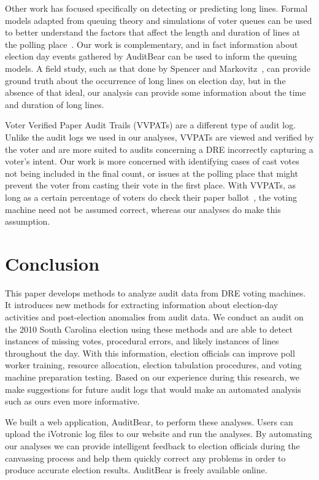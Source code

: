 \documentclass[letterpaper,twocolumn,10pt]{article}
\begin{document}
Other work has focused specifically on detecting or predicting long
lines. Formal models adapted from queuing theory and simulations of voter queues
can be used to better understand the factors that affect the length and duration
of lines at the polling place~\cite{Allen2006, Edel2010}. Our work is
complementary, and in fact information about election day events gathered by
AuditBear can be used to inform the queuing models. A field study, such as that
done by Spencer and Markovitz~\cite{Spencer2010}, can provide ground truth about
the occurrence of long lines on election day, but in the absence of that ideal,
our analysis can provide some information about the time and duration of long
lines. 

Voter Verified Paper Audit Trails (VVPATs) are a different type of audit
log. Unlike the audit logs we used in our analyses, VVPATs are viewed and
verified by the voter and are more suited to audits concerning a DRE incorrectly
capturing a voter’s intent. Our work is more concerned with identifying cases of
cast votes not being included in the final count, or issues at the polling place
that might prevent the voter from casting their vote in the first place. With
VVPATs, as long as a certain percentage of voters do check their paper
ballot~\cite{Hall2006}, the voting machine need not be assumed correct, whereas
our analyses do make this assumption. 

\section{Conclusion}
This paper develops methods to analyze audit data from DRE voting machines. It 
introduces new methods for extracting information about election-day activities
and post-election anomalies from audit data.  
We conduct an audit on the 2010 South Carolina 
election using these methods and are able to detect instances of missing votes,
procedural errors, and likely instances of lines throughout the day. With this
information, election officials can improve poll worker 
training, resource allocation, election tabulation procedures, and 
voting machine preparation testing. Based on our experience during this
research, we make suggestions for future audit logs that would make an automated
analysis such as ours even more informative.
 
We built a web application, AuditBear, to perform these analyses. Users can
upload the iVotronic log files to our website and run the analyses. By automating our
analyses we can provide intelligent feedback to election officials during the
canvassing process and help them quickly correct any problems in order to
produce accurate election results. AuditBear is freely available online.  
 
\end{document}
